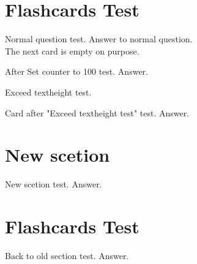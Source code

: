 \documentclass{../flashcards}
\begin{document}
\section{Flashcards Test}

\begin{card}{Normal question test.}
Answer to normal question.\\
The next card is empty on purpose.
\end{card}

\begin{card}{}

\end{card}

\setcounter{card}{100}
\begin{card}{After Set counter to 100 test.}
Answer.
\end{card}

\begin{card}{Exceed textheight test.}
\footnotesize
\blindtext[4]
\end{card}

\begin{card}{Card after "Exceed textheight test" test.}
Answer.
\end{card}

\section{New scetion}
\begin{card}{New scetion test.}
Answer.
\end{card}

\section{Flashcards Test}
\begin{card}{Back to old section test.}
Answer.
\end{card}

\listofcard

\printindex
\end{document}
